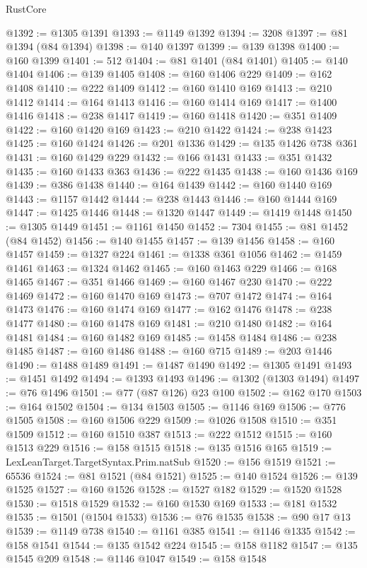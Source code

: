 \begin{lexlean}{RustCore}
\begin{coremodule}
@1392 := @1305 @1391
@1393 := @1149 @1392
@1394 := 3208
@1397 := @81 @1394 (@84 @1394)
@1398 := @140 @1397
@1399 := @139 @1398
@1400 := @160 @1399
@1401 := 512
@1404 := @81 @1401 (@84 @1401)
@1405 := @140 @1404
@1406 := @139 @1405
@1408 := @160 @1406 @229
@1409 := @162 @1408
@1410 := @222 @1409
@1412 := @160 @1410 @169
@1413 := @210 @1412
@1414 := @164 @1413
@1416 := @160 @1414 @169
@1417 := @1400 @1416
@1418 := @238 @1417
@1419 := @160 @1418
@1420 := @351 @1409
@1422 := @160 @1420 @169
@1423 := @210 @1422
@1424 := @238 @1423
@1425 := @160 @1424
@1426 := @201 @1336
@1429 := @135 @1426 @738 @361
@1431 := @160 @1429 @229
@1432 := @166 @1431
@1433 := @351 @1432
@1435 := @160 @1433 @363
@1436 := @222 @1435
@1438 := @160 @1436 @169
@1439 := @386 @1438
@1440 := @164 @1439
@1442 := @160 @1440 @169
@1443 := @1157 @1442
@1444 := @238 @1443
@1446 := @160 @1444 @169
@1447 := @1425 @1446
@1448 := @1320 @1447
@1449 := @1419 @1448
@1450 := @1305 @1449
@1451 := @1161 @1450
@1452 := 7304
@1455 := @81 @1452 (@84 @1452)
@1456 := @140 @1455
@1457 := @139 @1456
@1458 := @160 @1457
@1459 := @1327 @224
@1461 := @1338 @361 @1056
@1462 := @1459 @1461
@1463 := @1324 @1462
@1465 := @160 @1463 @229
@1466 := @168 @1465
@1467 := @351 @1466
@1469 := @160 @1467 @230
@1470 := @222 @1469
@1472 := @160 @1470 @169
@1473 := @707 @1472
@1474 := @164 @1473
@1476 := @160 @1474 @169
@1477 := @162 @1476
@1478 := @238 @1477
@1480 := @160 @1478 @169
@1481 := @210 @1480
@1482 := @164 @1481
@1484 := @160 @1482 @169
@1485 := @1458 @1484
@1486 := @238 @1485
@1487 := @160 @1486
@1488 := @160 @715
@1489 := @203 @1446
@1490 := @1488 @1489
@1491 := @1487 @1490
@1492 := @1305 @1491
@1493 := @1451 @1492
@1494 := @1393 @1493
@1496 := @1302 (@1303 @1494)
@1497 := @76 @1496
@1501 := @77 (@87 @126) @23 @100
@1502 := @162 @170
@1503 := @164 @1502
@1504 := @134 @1503
@1505 := @1146 @169
@1506 := @776 @1505
@1508 := @160 @1506 @229
@1509 := @1026 @1508
@1510 := @351 @1509
@1512 := @160 @1510 @387
@1513 := @222 @1512
@1515 := @160 @1513 @229
@1516 := @158 @1515
@1518 := @135 @1516 @165
@1519 := LexLeanTarget.TargetSyntax.Prim.natSub
@1520 := @156 @1519
@1521 := 65536
@1524 := @81 @1521 (@84 @1521)
@1525 := @140 @1524
@1526 := @139 @1525
@1527 := @160 @1526
@1528 := @1527 @182
@1529 := @1520 @1528
@1530 := @1518 @1529
@1532 := @160 @1530 @169
@1533 := @181 @1532
@1535 := @1501 (@1504 @1533)
@1536 := @76 @1535
@1538 := @90 @17 @13
@1539 := @1149 @738
@1540 := @1161 @385
@1541 := @1146 @1335
@1542 := @158 @1541
@1544 := @135 @1542 @224
@1545 := @158 @1182
@1547 := @135 @1545 @209
@1548 := @1146 @1047
@1549 := @158 @1548

\end{coremodule}
\end{lexlean}
